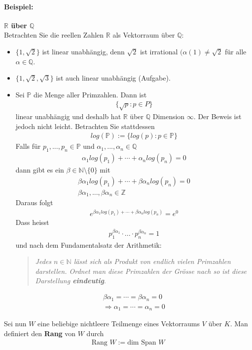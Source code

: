 \documentclass[11pt]{report}
\newcommand*\Zb[1] {\mathbb{#1}}
\newcommand*\f[1] {\textbf{#1}}
\begin{document}
\paragraph{Beispiel:} \f{$\Zb{R}$ über $\Zb{Q}$}\\
Betrachten Sie die reellen Zahlen $\Zb{R}$ als Vektorraum über $\Zb{Q}$:
\begin{itemize}
 \item $\{1, \sqrt{2}\}$ ist linear unabhängig, denn $\sqrt{2}$ ist irrational $(\alpha(1) \neq \sqrt{2}$ für alle $\alpha \in \Zb{Q}$.
 \item $\{1, \sqrt{2}, \sqrt{3}\}$ ist auch linear unabhängig (Aufgabe).
 \item Sei $\Zb{P}$ die Menge aller Primzahlen. Dann ist 
\begin{align}
 \{\sqrt{p}: p \in P\}
\end{align}
linear unabhängig und deshalb hat $\Zb{R}$ über $\Zb{Q}$ Dimension $\infty$. Der Beweis ist jedoch  nicht leicht. Betrachten Sie stattdessen
\begin{align}
 log(\Zb{P}) := \{log(p): p \in \Zb{P}\}
\end{align}
Falls für $p_1, ..., p_n \in \Zb{P}$ und $\alpha_1, ..., \alpha_n \in \Zb{Q}$
\begin{align}
 \alpha_1 log(p_1) + \cdots + \alpha_n log(p_n) = 0
\end{align}
dann gibt es ein $\beta \in \Zb{N}\setminus\{0\}$ mit
\begin{align}
 \beta \alpha_1 log(p_1) + \cdots + \beta\alpha_n log(p_n) = 0 \\
\beta\alpha_1, ..., \beta\alpha_n\in \Zb{Z}
\end{align}
Daraus folgt
\begin{align}
e^{\beta\alpha_1 log(p_1) + \cdots + \beta\alpha_n log(p_n)} = e^0
\end{align}
Dass heisst
\begin{align}
 p_1^{\beta\alpha_1} \cdot ... \cdot p_n^{\beta\alpha_n} = 1
\end{align}
und nach dem Fundamentalsatz der Arithmetik:
\begin{quotation}
\noindent \textit{Jedes $n \in \Zb{N}$ lässt sich als Produkt von endlich vielen Primzahlen darstellen. Ordnet man diese Primzahlen der Grösse nach so ist diese Darstellung \f{eindeutig}}.
\end{quotation}
\begin{align}
 \beta\alpha_1 = \cdots = \beta\alpha_n = 0 \\
\Rightarrow \alpha_1 = \cdots = \alpha_n = 0
\end{align}
\end{itemize}
Sei nun $W$ eine beliebige nichtleere Teilmenge eines Vektorraums $V$ über $K$. Man definiert den \f{Rang} von $W$ durch
\begin{align}
 \text{Rang } W := \text{dim Span } W 
\end{align}
\end{document}
